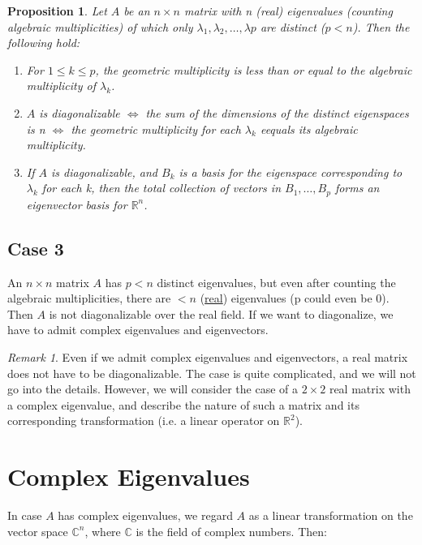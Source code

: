\documentclass[]{extarticle}
\theoremstyle{Simple}
\newtheorem{prop}[thm]{Proposition}
\theoremstyle{definition}
\theoremstyle{remark}
\newtheorem*{rem}{Remark}
\theoremstyle{example}
\begin{document}
\begin{prop}
Let $A$ be an $n \times n$ matrix with n (real) eigenvalues (counting algebraic multiplicities) of which only $\lambda_{1}, \lambda_{2}, \dots, \lambda{p}$ are distinct ($p < n$). Then the following hold:

\begin{enumerate}
\item For $1 \leq k \leq p$, the geometric multiplicity is less than or equal to the algebraic multiplicity of $\lambda_{k}$.
\item $A$ is diagonalizable $\iff$ the sum of the dimensions of the distinct eigenspaces is n $\iff$ the geometric multiplicity for each $\lambda_{k}$ eequals its algebraic multiplicity.
\item If $A$ is diagonalizable, and $B_{k}$ is a basis for the eigenspace corresponding to $\lambda_{k}$ for each k, then the total collection of vectors in $B_{1}, \dots, B_{p}$ forms an eigenvector basis for $\mathbb{R}^{n}$.
\end{enumerate}

\end{prop}

\subsection{Case 3}

An $n \times n$ matrix $A$ has $p < n$ distinct eigenvalues, but even after counting the algebraic multiplicities, there are $< n$ (\underline{real}) eigenvalues (p could even be 0). Then $A$ is not diagonalizable over the real field. If we want to diagonalize, we have to admit complex eigenvalues and eigenvectors.

\begin{rem}
Even if we admit complex eigenvalues and
eigenvectors, a real matrix does not have to be
diagonalizable. The case is quite complicated, and we will
not go into the details. However, we will consider the case
of a $2 \times 2$ real matrix with a complex eigenvalue, and
describe the nature of such a matrix and its corresponding
transformation (i.e. a linear operator on $\mathbb{R}^{2}$).
\end{rem}

\section{Complex Eigenvalues}

In case $A$ has complex eigenvalues, we regard $A$ as a linear transformation on the vector space $\mathbb{C}^{n}$, where $\mathbb{C}$ is the field of complex numbers. Then:
\end{document}
